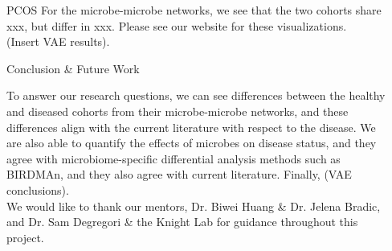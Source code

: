 \documentclass[final]{beamer}
\newlength{\sepwidth}
\newlength{\colwidth}
\newcommand{\separatorcolumn}{\begin{column}{\sepwidth}\end{column}}
\begin{document}
\begin{frame}[t]
\begin{columns}[t]
\begin{column}{\colwidth}
\begin{block}{PCOS}
    For the microbe-microbe networks, we see that the two cohorts share xxx, but differ in xxx. Please see our website for these visualizations. \\

   (Insert VAE results).

  \end{block}

  \begin{block}{Conclusion \& Future Work}

	To answer our research questions, we can see differences between the healthy and diseased cohorts from their microbe-microbe networks, and these differences align with the current literature with respect to the disease. We are also able to quantify the effects of microbes on disease status, and they agree with microbiome-specific differential analysis methods such as BIRDMAn, and they also agree with current literature. Finally, (VAE conclusions). \\
	
	We would like to thank our mentors, Dr. Biwei Huang \& Dr. Jelena Bradic, and Dr. Sam Degregori \& the Knight Lab for guidance throughout this project. 
    
  \end{block}

%    
%    

\end{column}

\separatorcolumn
\end{columns}
\end{frame}
\end{document}
